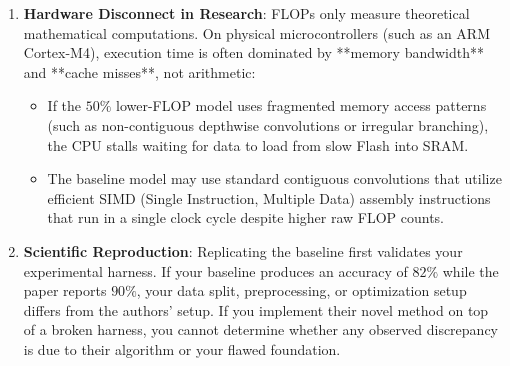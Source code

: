 \begin{enumerate}
    \item \textbf{Hardware Disconnect in Research}:
    FLOPs only measure theoretical mathematical computations. On physical microcontrollers (such as an ARM Cortex-M4), execution time is often dominated by **memory bandwidth** and **cache misses**, not arithmetic:
    \begin{itemize}
        \item If the $50\%$ lower-FLOP model uses fragmented memory access patterns (such as non-contiguous depthwise convolutions or irregular branching), the CPU stalls waiting for data to load from slow Flash into SRAM.
        \item The baseline model may use standard contiguous convolutions that utilize efficient SIMD (Single Instruction, Multiple Data) assembly instructions that run in a single clock cycle despite higher raw FLOP counts.
    \end{itemize}

    \item \textbf{Scientific Reproduction}:
    Replicating the baseline first validates your experimental harness. If your baseline produces an accuracy of $82\%$ while the paper reports $90\%$, your data split, preprocessing, or optimization setup differs from the authors' setup. If you implement their novel method on top of a broken harness, you cannot determine whether any observed discrepancy is due to their algorithm or your flawed foundation.
\end{enumerate}